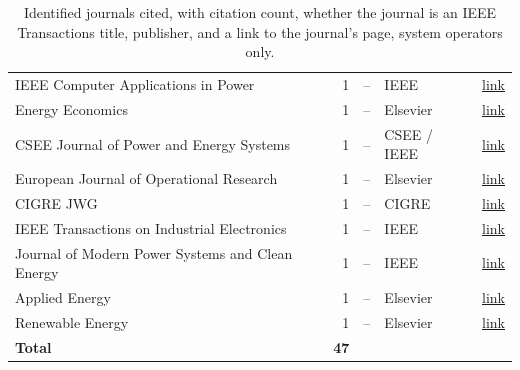 \begin{table}[htbp]
\begin{tabular}{lrcll}
    IEEE Computer Applications in Power & 1 & -- & IEEE & \href{https://ieeexplore.ieee.org/xpl/RecentIssue.jsp?punumber=67}{link} \\
    Energy Economics & 1 & -- & Elsevier & \href{https://www.sciencedirect.com/journal/energy-economics}{link} \\
    CSEE Journal of Power and Energy Systems & 1 & -- & CSEE / IEEE & \href{https://ieeexplore.ieee.org/xpl/RecentIssue.jsp?punumber=7054730}{link} \\
    European Journal of Operational Research & 1 & -- & Elsevier & \href{https://www.sciencedirect.com/journal/european-journal-of-operational-research}{link} \\
    CIGRE JWG & 1 & -- & CIGRE & \href{https://www.cigre.org/GB/publications/electra}{link} \\
    IEEE Transactions on Industrial Electronics & 1 & -- & IEEE & \href{https://ieeexplore.ieee.org/xpl/RecentIssue.jsp?punumber=41}{link} \\
    Journal of Modern Power Systems and Clean Energy & 1 & -- & IEEE & \href{https://www.mpce.info/}{link} \\
    Applied Energy & 1 & -- & Elsevier & \href{https://www.sciencedirect.com/journal/applied-energy}{link} \\
    Renewable Energy & 1 & -- & Elsevier & \href{https://www.sciencedirect.com/journal/renewable-energy}{link} \\
\midrule
    \textbf{Total} & \textbf{47} & & & \\
\bottomrule
\end{tabular}
\caption{Identified journals cited, with citation count, whether the journal is an IEEE Transactions title, publisher, and a link to the journal's page, system operators only.}
\label{tab:journal_publishers_system_operators}
\end{table}
